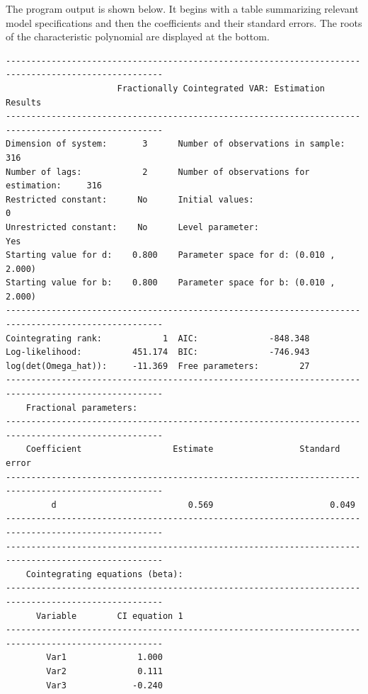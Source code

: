 \documentclass[10pt]{article}
\begin{document}
The program output is shown below. It begins with a table summarizing relevant model specifications and then the coefficients and their standard errors. The roots of the characteristic polynomial are displayed at the bottom. 

\begin{verbatim}
-----------------------------------------------------------------------------------------------------
                      Fractionally Cointegrated VAR: Estimation Results                              
-----------------------------------------------------------------------------------------------------
Dimension of system:       3      Number of observations in sample:          316 
Number of lags:            2      Number of observations for estimation:     316 
Restricted constant:      No      Initial values:                              0
Unrestricted constant:    No      Level parameter:                           Yes
Starting value for d:    0.800    Parameter space for d: (0.010 , 2.000) 
Starting value for b:    0.800    Parameter space for b: (0.010 , 2.000) 
-----------------------------------------------------------------------------------------------------
Cointegrating rank:            1  AIC:              -848.348 
Log-likelihood:          451.174  BIC:              -746.943 
log(det(Omega_hat)):     -11.369  Free parameters:        27 
-----------------------------------------------------------------------------------------------------
    Fractional parameters:                                                                             
-----------------------------------------------------------------------------------------------------
    Coefficient              	 Estimate              	  Standard error 
-----------------------------------------------------------------------------------------------------
         d                   	    0.569              	        0.049                
-----------------------------------------------------------------------------------------------------
-----------------------------------------------------------------------------------------------------
    Cointegrating equations (beta):                                                                  
-----------------------------------------------------------------------------------------------------
      Variable        CI equation 1  
-----------------------------------------------------------------------------------------------------
        Var1              1.000     
        Var2              0.111     
        Var3             -0.240     

\end{verbatim}
\end{document}
